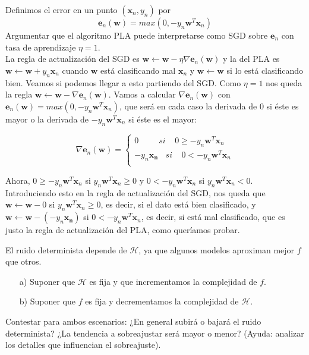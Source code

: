 \documentclass[12pt]{article}
\theoremstyle{definition}
\begin{document}
\begin{pregunta}
Definimos el error en un punto $(\mathbf{x}_n,y_n)$ por 
\[		\mathbf{e}_n(\mathbf{w})=max(0,-y_n\mathbf{w}^T\mathbf{x}_n)		\]
Argumentar que el algoritmo PLA puede interpretarse como SGD sobre $\mathbf{e}_n$ con tasa de aprendizaje $\eta=1$.\\

La regla de actualización del SGD es $\mathbf{w} \leftarrow \mathbf{w} - \eta\nabla \mathbf{e}_n(\mathbf{w})$ y la del PLA es $\mathbf{w} \leftarrow \mathbf{w} + y_n\mathbf{x}_n$ cuando $\mathbf{w}$ está clasificando mal $\mathbf{x}_n$ y $\mathbf{w} \leftarrow \mathbf{w}$ si lo está clasificando bien. Veamos si podemos llegar a esto partiendo del SGD. Como $\eta = 1$ nos queda la regla $\mathbf{w} \leftarrow \mathbf{w} - \nabla \mathbf{e}_n(\mathbf{w})$. Vamos a calcular $\nabla \mathbf{e}_n(\mathbf{w})$ con $\mathbf{e}_n(\mathbf{w})=max(0,-y_n\mathbf{w}^T\mathbf{x}_n)$, que será en cada caso la derivada de 0 si éste es mayor o la derivada de $-y_n\mathbf{w}^T\mathbf{x}_n$ si éste es el mayor:

\begin{equation}
\nabla \mathbf{e}_n(\mathbf{w}) = 
  \left\lbrace
  \begin{array}{l}
     0\ \ \ \ \ \ \ \ \ \ \ si\ \ \ \ \  0 \geq -y_n\mathbf{w}^T\mathbf{x}_n \\
     -y_n\mathbf{x_n}\ \ \ \  si\ \ \ \ \  0 < -y_n\mathbf{w}^T\mathbf{x}_n \\
  \end{array}
  \right.
\end{equation}

Ahora, $0 \geq -y_n\mathbf{w}^T\mathbf{x}_n$ si $y_n\mathbf{w}^T\mathbf{x}_n \geq 0$ y $0 < -y_n\mathbf{w}^T\mathbf{x}_n$ si $y_n\mathbf{w}^T\mathbf{x}_n < 0$. Introduciendo esto en la regla de actualización del SGD, nos queda que $\mathbf{w} \leftarrow \mathbf{w} - 0$ si $y_n\mathbf{w}^T\mathbf{x}_n \geq 0$, es decir, si el dato está bien clasificado, y $\mathbf{w} \leftarrow \mathbf{w} - (-y_n\mathbf{x_n})$ si $0 < -y_n\mathbf{w}^T\mathbf{x}_n$, es decir, si está mal clasificado, que es justo la regla de actualización del PLA, como queríamos probar.

\end{pregunta}

\begin{pregunta}
El ruido determinista depende de $\mathcal{H}$, ya que algunos modelos aproximan mejor $f$ que otros.
\begin{enumerate}
\item[a)] Suponer que $\mathcal{H}$ es fija y que incrementamos la complejidad de $f$.
\item[b)] Suponer que $f$ es fija y decrementamos la complejidad de $\mathcal{H}$.
\end{enumerate}
Contestar para ambos escenarios: ¿En general subirá o bajará el ruido determinista? ¿La tendencia a sobreajustar será mayor o menor? (Ayuda: analizar los detalles que influencian el sobreajuste).\\


\end{pregunta}
\end{document}
